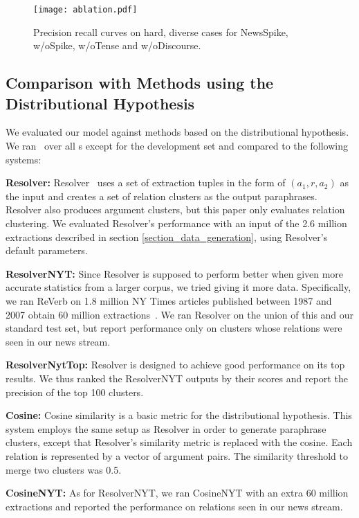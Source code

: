 \begin{figure}
\centering
\texttt{[image: ablation.pdf]}
\caption{Precision recall curves on hard, diverse cases for NewsSpike,
w/oSpike, w/oTense and w/oDiscourse. }
\label{ablation}
\end{figure}




\subsection{Comparison with Methods using the Distributional Hypothesis}
\label{section_methods_of_distributional} We evaluated our model against
methods based on the distributional hypothesis. We ran \sys\ over all \bag
s except for the development set and compared to the following systems:

{\bf Resolver: } Resolver~\cite{yates2009unsupervised} uses a set of
extraction tuples in the form of $(a_1,r,a_2)$ as the input and creates a
set of relation clusters as the output paraphrases. Resolver also
produces argument clusters, but this paper only evaluates relation
clustering. We evaluated Resolver's performance with an input of the 2.6
million extractions described in section \ref{section_data_generation}, using Resolver's
default parameters.


{\bf ResolverNYT: } Since Resolver is supposed to perform better when given
more accurate statistics from a larger corpus, we tried giving it more
data. Specifically, we ran ReVerb on 1.8 million NY Times articles
published between 1987 and 2007 obtain 60 million
extractions~\cite{sandhaus08}.  We ran Resolver on the union of this and
our standard test set, but report performance only on clusters whose
relations were seen in our news stream.

{\bf ResolverNytTop: } Resolver is designed to achieve good performance on
its top results. We thus ranked the ResolverNYT outputs by their scores and
report the precision of the top 100 clusters.

{\bf Cosine: } Cosine similarity is a basic metric for the distributional
hypothesis. This system employs the same setup as Resolver in order to
generate paraphrase clusters, except that Resolver's similarity metric is
replaced with the cosine. Each relation is represented by a vector of
argument pairs. The similarity threshold to merge two clusters was 0.5.

{\bf CosineNYT: } As for ResolverNYT, we ran CosineNYT with an extra
60 million extractions and reported the performance on relations seen in
our news stream.






